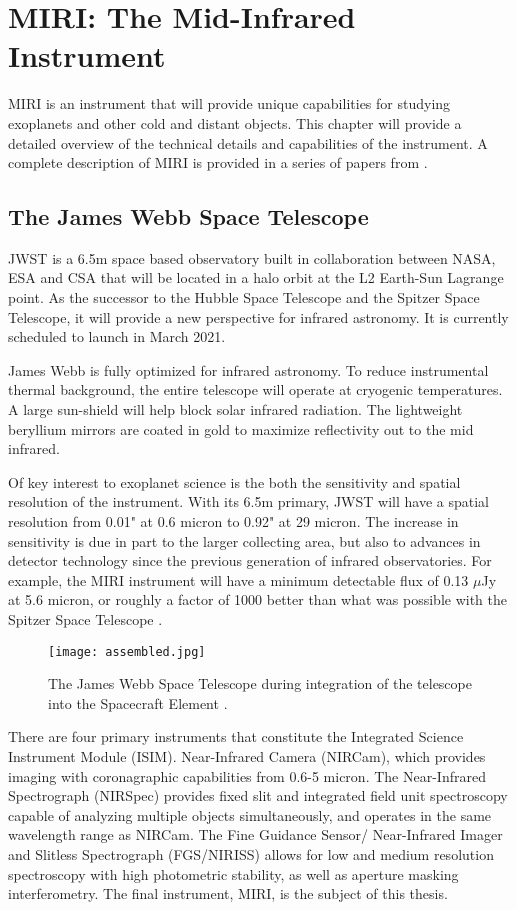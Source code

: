 \chapter{MIRI: The Mid-Infrared Instrument}
MIRI is an instrument that will provide unique capabilities for studying exoplanets and other cold and distant objects. This chapter will provide a detailed overview of the technical details and capabilities of the instrument. A complete description of MIRI is provided in a series of papers from \parencite{MIRI1,MIRI2,MIRI3, MIRI4,MIRI5,MIRI6,MIRI7,MIRI8,MIRI9}.
%
%
\section{The James Webb Space Telescope}
JWST is a 6.5m space based observatory built in collaboration between NASA, ESA and CSA that will be located in a halo orbit at the L2 Earth-Sun Lagrange point. 
As the successor to the Hubble Space Telescope and the Spitzer Space Telescope, it will provide a new perspective for infrared astronomy. 
It is currently scheduled to launch in March 2021.

James Webb is fully optimized for infrared astronomy. 
To reduce instrumental thermal background, the entire telescope will operate at cryogenic temperatures. 
A large sun-shield will help block solar infrared radiation.
The lightweight beryllium mirrors are coated in gold to maximize reflectivity out to the mid infrared.

Of key interest to exoplanet science is the both the sensitivity and spatial resolution of the instrument. 
With its 6.5m primary, JWST will have a spatial resolution from 0.01" at 0.6 micron to 0.92" at 29 micron.
The increase in sensitivity is due in part to the larger collecting area, but also to advances in detector technology since the previous generation of infrared observatories.
For example, the MIRI instrument will have a minimum detectable flux of 0.13 $\mu$Jy at 5.6 micron, or roughly a factor of 1000 better than what was possible with the Spitzer Space Telescope \parencite{MIRI9}.
\begin{figure}[t]
	\texttt{[image: assembled.jpg]}
	\caption{The James Webb Space Telescope during integration of the telescope into the Spacecraft Element \parencite{assembled}. }
	\label{fig:jwst}
\end{figure}

There are four primary instruments that constitute the Integrated Science Instrument Module (ISIM). 
Near-Infrared Camera (NIRCam), which provides imaging with coronagraphic capabilities from 0.6-5 micron.
The Near-Infrared Spectrograph (NIRSpec) provides fixed slit and integrated field unit spectroscopy capable of analyzing multiple objects simultaneously, and operates in the same wavelength range as NIRCam.
The Fine Guidance Sensor/ Near-Infrared Imager and Slitless Spectrograph (FGS/NIRISS) allows for low and medium resolution spectroscopy with high photometric stability, as well as aperture masking interferometry. 
The final instrument, MIRI, is the subject of this thesis.


